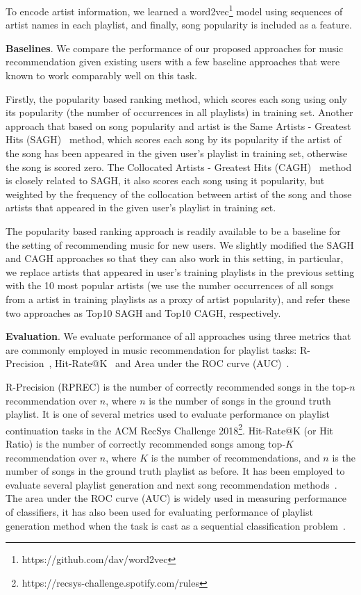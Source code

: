 To encode artist information, we learned a word2vec\footnote{https://github.com/dav/word2vec} model using sequences of artist names in each playlist,
and finally, song popularity is included as a feature.


{\bf Baselines}.
We compare the performance of our proposed approaches for music recommendation given existing users
with a few baseline approaches that were known to work comparably well on this task.

Firstly, the popularity based ranking method, which scores each song using only its popularity 
(the number of occurrences in all playlists) in training set.
%
Another approach that based on song popularity and artist is the Same Artists - Greatest Hits (SAGH)~\cite{mcfee2012million} method,
which scores each song by its popularity if the artist of the song has been appeared in the given user's playlist in training set, 
otherwise the song is scored zero.
%
The Collocated Artists - Greatest Hits (CAGH)~\cite{bonnin2013evaluating} method is closely related to SAGH,
it also scores each song using it popularity, but weighted by the frequency of the collocation between artist of the song 
and those artists that appeared in the given user's playlist in training set.

The popularity based ranking approach is readily available to be a baseline for the setting of recommending music for new users.
%
We slightly modified the SAGH and CAGH approaches so that they can also work in this setting,
in particular, we replace artists that appeared in user's training playlists in the previous setting with the 10 most popular artists
(we use the number occurrences of all songs from a artist in training playlists as a proxy of artist popularity),
and refer these two approaches as Top10 SAGH and Top10 CAGH, respectively.


{\bf Evaluation}.
We evaluate performance of all approaches using three metrics that are commonly employed in music recommendation for playlist tasks:
R-Precision~\cite{manning2008introIR}, Hit-Rate@K~\cite{hariri2012context} and Area under the ROC curve (AUC)~\cite{manning2008introIR}.

R-Precision (RPREC) is the number of correctly recommended songs in the top-$n$ recommendation over $n$,
where $n$ is the number of songs in the ground truth playlist.
It is one of several metrics used to evaluate performance on playlist continuation tasks 
in the ACM RecSys Challenge 2018\footnote{https://recsys-challenge.spotify.com/rules}.
%
Hit-Rate@K (or Hit Ratio) is the number of correctly recommended songs among top-$K$ recommendation over $n$,
where $K$ is the number of recommendations, and $n$ is the number of songs in the ground truth playlist as before.
It has been employed to evaluate several playlist generation and next song recommendation 
methods~\cite{hariri2012context,bonnin2013evaluating,bonnin2015automated,jannach2015beyond}.
%
The area under the ROC curve (AUC) is widely used in measuring performance of classifiers,
it has also been used for evaluating performance of playlist generation method when the task
is cast as a sequential classification problem~\cite{ben2017groove}.



